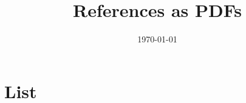 \documentclass{article}
\begin{document}
\title{References as PDFs}

\date{\today}

\maketitle

\section{List}
\end{document}
